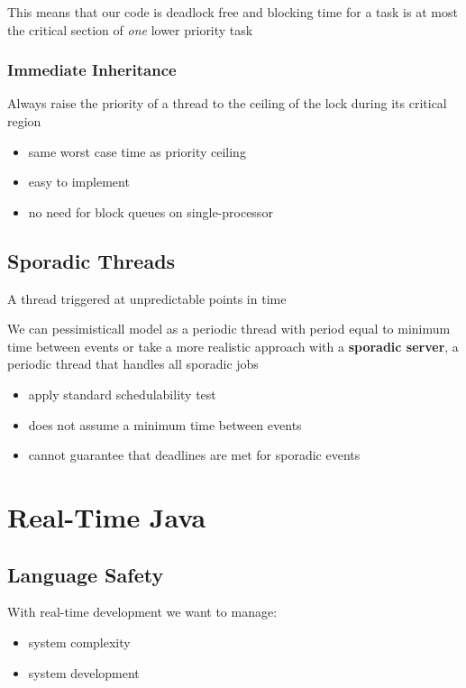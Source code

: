 \documentclass[]{article}
\theoremstyle{definition}
\begin{document}
	This means that our code is deadlock free and blocking time for a task is at most the critical section of \textit{one} lower priority task

	\subsubsection{Immediate Inheritance} 
	Always raise the priority of a thread to the ceiling of the lock during its critical region

	\begin{itemize}
		\item same worst case time as priority ceiling
		\item easy to implement
		\item no need for block queues on single-processor
	\end{itemize}
	
	\subsection{Sporadic Threads}
	A thread triggered at unpredictable points in time

	We can pessimisticall model as a periodic thread with period equal to minimum time between events or take a more realistic approach with a \textbf{sporadic server}, a periodic thread that handles all sporadic jobs
	\begin{itemize}
		\item apply standard schedulability test
		\item does not assume a minimum time between events
		\item cannot guarantee that deadlines are met for sporadic events
	\end{itemize}


	\section{Real-Time Java}

	\subsection{Language Safety}
	With real-time development we want to manage:
	\begin{itemize}
		\item system complexity
		\item system development
	\end{itemize}
\end{document}
